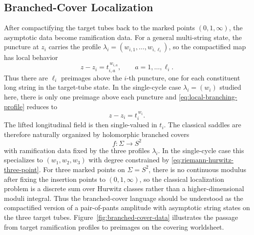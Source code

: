 \documentclass[11pt]{article}
\begin{document}
\subsection{Branched-Cover Localization}

After compactifying the target tubes back to the marked points $(0,1,\infty)$, the asymptotic data become ramification data. For a general multi-string state, the puncture at $z_i$ carries the profile $\lambda_i=(w_{i,1},\dots,w_{i,\ell_i})$, so the compactified map has local behavior
\begin{equation}\label{eq:local-branching-profile}
z-z_i=t_{i,a}^{\,w_{i,a}},
\qquad
a=1,\dots,\ell_i.
\end{equation}
Thus there are $\ell_i$ preimages above the $i$-th puncture, one for each constituent long string in the target-tube state. In the single-cycle case $\lambda_i=(w_i)$ studied here, there is only one preimage above each puncture and \eqref{eq:local-branching-profile} reduces to
\begin{equation}\label{eq:local-branching}
z-z_i=t_i^{\,w_i}.
\end{equation}
The lifted longitudinal field is then single-valued in $t_i$. The classical saddles are therefore naturally organized by holomorphic branched covers
\begin{equation}\label{eq:branched-cover-worldsheet}
f:\Sigma\to S^2
\end{equation}
with ramification data fixed by the three profiles $\lambda_i$. In the single-cycle case this specializes to $(w_1,w_2,w_3)$ with degree constrained by \eqref{eq:riemann-hurwitz-three-point}. For three marked points on $\Sigma=S^2$, there is no continuous modulus after fixing the insertion points to $(0,1,\infty)$, so the classical localization problem is a discrete sum over Hurwitz classes rather than a higher-dimensional moduli integral. Thus the branched-cover language should be understood as the compactified version of a pair-of-pants amplitude with asymptotic string states on the three target tubes.
Figure~\ref{fig:branched-cover-data} illustrates the passage from target ramification profiles to preimages on the covering worldsheet.
\end{document}
